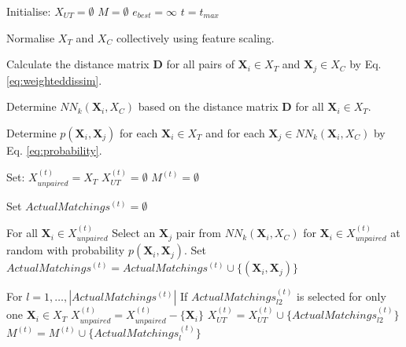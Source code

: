 		\begin{algorithm}
			\label{alg:wnnsa}
																
			Initialise:
			\linebreak
			\text{\quad}
			$X_{UT}=\emptyset$
			\linebreak
			\text{\quad}
			$M=\emptyset$
			\linebreak
			\text{\quad}
			$e_{best}=\infty$
			\linebreak
			\text{\quad}
			$t=t_{max}$
																
			Normalise $X_T$ and $X_C$ collectively using feature scaling.
																
			Calculate the distance matrix $\textbf{D}$ for all pairs of $\textbf{X}_i \in X_T$ and $\textbf{X}_j \in X_C$ by Eq. \ref{eq:weighteddissim}.
																
			Determine $NN_k(\textbf{X}_i, X_C)$ based on the distance matrix $\textbf{D}$ for all $\textbf{X}_i \in X_T$. 
																
			Determine $p(\textbf{X}_i,\textbf{X}_j)$ for each $\textbf{X}_i \in X_T$ and for each $\textbf{X}_j \in NN_k(\textbf{X}_i, X_C)$ by Eq. \ref{eq:probability}.
																
			Set:
			\linebreak
			\text{\quad}
			$X_{unpaired}^{(t)}=X_T$
			\linebreak
			\text{\quad}
			$X_{UT}^{(t)}=\emptyset$
			\linebreak
			\text{\quad}
			$M^{(t)}=\emptyset$
																
			Set $ActualMatchings^{(t)}=\emptyset$
																
			For all $\textbf{X}_i \in X_{unpaired}^{(t)}$
			\linebreak
			\text{\quad} Select an $\textbf{X}_j$ pair from $NN_k(\textbf{X}_i, X_C)$ for $\textbf{X}_i \in X_{unpaired}^{(t)}$
			at random with probability $p(\textbf{X}_i,\textbf{X}_j)$.
			\linebreak
			\text{\quad}
			Set $ActualMatchings^{(t)} = ActualMatchings^{(t)} \cup \{(\textbf{X}_i,\textbf{X}_j)\}$ 
																
			For $l=1, \dots, |ActualMatchings^{(t)}|$
			\linebreak
			\text{\quad}
			If $ActualMatchings_{l2}^{(t)}$ is selected for only one $\textbf{X}_i \in X_T$
			\linebreak
			\text{\quad}\text{\quad}
			$X_{unpaired}^{(t)}=X_{unpaired}^{(t)}-\{\textbf{X}_i\}$
			\linebreak
			\text{\quad}\text{\quad}
			$X_{UT}^{(t)}=X_{UT}^{(t)} \cup \{ActualMatchings_{l2}^{(t)}\}$
			\linebreak
			\text{\quad}\text{\quad}
			$M^{(t)}=M^{(t)} \cup \{ActualMatchings_{l}^{(t)}\}$
																

\end{algorithm}
